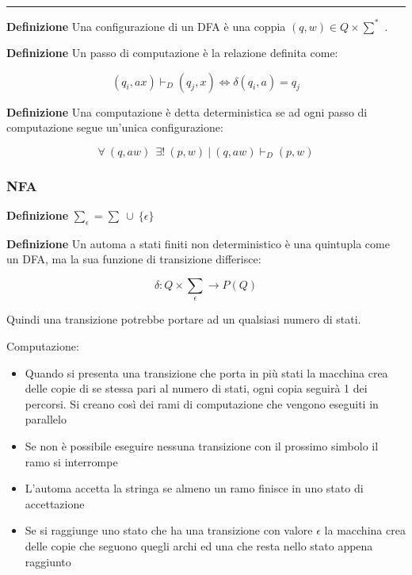 \documentclass{article}
\begin{document}
\noindent\rule{\textwidth}{0.5pt}\newline

\newpage

\noindent\textbf{Definizione} Una configurazione di un DFA è una coppia $(q,w)\in Q\times\sum^*$ .\newline

\noindent\textbf{Definizione} Un passo di computazione è la relazione definita come:

$$(q_i,ax)\vdash_D(q_j,x)\iff \delta(q_i,a)=q_j$$\newline

\noindent\textbf{Definizione} Una computazione è detta deterministica se ad ogni passo di computazione segue un'unica configurazione:

$$\forall \ (q,aw)\ \ \exists!\ (p,w) \ |\ (q,aw)\vdash_D(p,w)$$\newline

\subsubsection{NFA}

\noindent\textbf{Definizione} $\sum_\epsilon=\sum\ \cup\ \{\epsilon\}$\newline

\noindent\textbf{Definizione} Un automa a stati finiti non deterministico è una quintupla come un DFA, ma la sua funzione di transizione differisce:

$$\delta:Q\times\text{${\sum}_\epsilon$}\rightarrow P(Q)$$

\noindent Quindi una transizione potrebbe portare ad un qualsiasi numero di stati.\newline

\noindent Computazione:
\begin{itemize}
    \item Quando si presenta una transizione che porta in più stati la macchina crea delle copie di se stessa pari al numero di stati, ogni copia seguirà 1 dei percorsi. Si creano così dei rami di computazione che vengono eseguiti in parallelo

    \item Se non è possibile eseguire nessuna transizione con il prossimo simbolo il ramo si interrompe

    \item L'automa accetta la stringa se almeno un ramo finisce in uno stato di accettazione

    \item Se si raggiunge uno stato che ha una transizione con valore $\epsilon$ la macchina crea delle copie che seguono quegli archi ed una che resta nello stato appena raggiunto\newline
    
\end{itemize}
\end{document}
